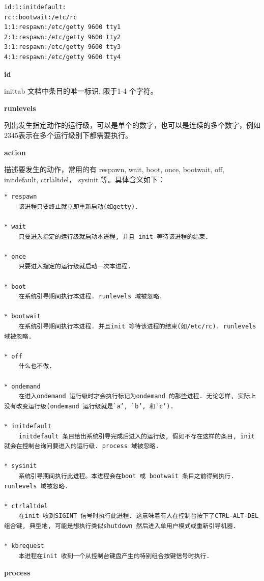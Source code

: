 {\begin{shaded}\begin{verbatim}
id:1:initdefault:
rc::bootwait:/etc/rc
1:1:respawn:/etc/getty 9600 tty1
2:1:respawn:/etc/getty 9600 tty2
3:1:respawn:/etc/getty 9600 tty3
4:1:respawn:/etc/getty 9600 tty4
\end{verbatim}\end{shaded}}
\textbf{id}

inittab 文档中条目的唯一标识, 限于1-4 个字符。

\textbf{runlevels}

列出发生指定动作的运行级，可以是单个的数字，也可以是连续的多个数字，例如2345表示在多个运行级别下都需要执行。

\textbf{action}

描述要发生的动作，常用的有 respawn, wait, boot, once, bootwait, off,
initdefault, ctrlaltdel， sysinit 等。具体含义如下：

{\begin{shaded}\begin{verbatim}
* respawn  
    该进程只要终止就立即重新启动(如getty).

* wait  
    只要进入指定的运行级就启动本进程, 并且 init 等待该进程的结束.

* once  
    只要进入指定的运行级就启动一次本进程.

* boot  
    在系统引导期间执行本进程. runlevels 域被忽略.

* bootwait  
    在系统引导期间执行本进程. 并且init 等待该进程的结束(如/etc/rc). runlevels 域被忽略.

* off  
    什么也不做.

* ondemand  
    在进入ondemand 运行级时才会执行标记为ondemand 的那些进程. 无论怎样, 实际上没有改变运行级(ondemand 运行级就是`a’, `b’, 和`c’).

* initdefault  
    initdefault 条目给出系统引导完成后进入的运行级, 假如不存在这样的条目, init 就会在控制台询问要进入的运行级. process 域被忽略.

* sysinit  
    系统引导期间执行此进程。本进程会在boot 或 bootwait 条目之前得到执行. runlevels 域被忽略.

* ctrlaltdel  
    在init 收到SIGINT 信号时执行此进程. 这意味着有人在控制台按下了CTRL-ALT-DEL 组合键, 典型地, 可能是想执行类似shutdown 然后进入单用户模式或重新引导机器.

* kbrequest  
    本进程在init 收到一个从控制台键盘产生的特别组合按键信号时执行.
\end{verbatim}\end{shaded}}
\textbf{process}

